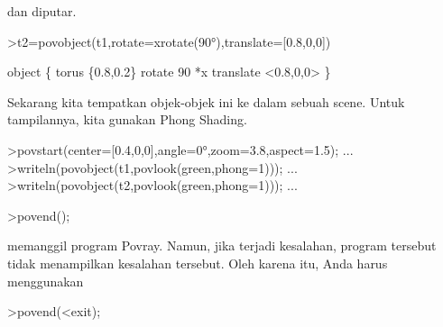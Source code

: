 \documentclass[a4paper,10pt]{article}
\begin{document}
\begin{eulernotebook}
\begin{eulercomment}
\begin{eulercomment}
\begin{eulercomment}
\begin{eulercomment}
\begin{eulercomment}
\begin{eulercomment}
\begin{eulercomment}
\begin{eulercomment}
\begin{eulercomment}
\begin{eulercomment}
\begin{eulercomment}
\begin{eulercomment}
\begin{eulercomment}
\begin{eulercomment}
\begin{eulercomment}
\begin{eulercomment}
\begin{eulercomment}
\begin{eulercomment}
\begin{eulercomment}
\begin{eulercomment}
\begin{eulercomment}
\begin{eulercomment}
\begin{eulercomment}
\begin{eulercomment}
\begin{eulercomment}
\begin{eulercomment}
\begin{eulercomment}
\begin{eulercomment}
\begin{eulercomment}
\begin{eulercomment}
\begin{eulercomment}
\begin{eulercomment}
\begin{eulercomment}
\begin{eulercomment}
\begin{eulercomment}
\begin{eulercomment}
\begin{eulercomment}
\begin{eulercomment}
\begin{eulercomment}
\begin{eulercomment}
\begin{eulercomment}
dan diputar.
\end{eulercomment}
\begin{eulerprompt}
>t2=povobject(t1,rotate=xrotate(90°),translate=[0.8,0,0])
\end{eulerprompt}
\begin{euleroutput}
  object \{ torus \{0.8,0.2\}
   rotate 90 *x 
   translate <0.8,0,0>
   \}
\end{euleroutput}
\begin{eulercomment}
Sekarang kita tempatkan objek-objek ini ke dalam sebuah scene. Untuk
tampilannya, kita gunakan Phong Shading.
\end{eulercomment}
\begin{eulerprompt}
>povstart(center=[0.4,0,0],angle=0°,zoom=3.8,aspect=1.5); ...
>writeln(povobject(t1,povlook(green,phong=1))); ...
>writeln(povobject(t2,povlook(green,phong=1))); ...
\end{eulerprompt}
\begin{eulercomment}
\textgreater{}povend();

memanggil program Povray. Namun, jika terjadi kesalahan, program
tersebut tidak menampilkan kesalahan tersebut. Oleh karena itu, Anda
harus menggunakan

\textgreater{}povend(\textless{}exit);


\end{eulercomment}
\end{eulercomment}
\end{eulercomment}
\end{eulercomment}
\end{eulercomment}
\end{eulercomment}
\end{eulercomment}
\end{eulercomment}
\end{eulercomment}
\end{eulercomment}
\end{eulercomment}
\end{eulercomment}
\end{eulercomment}
\end{eulercomment}
\end{eulercomment}
\end{eulercomment}
\end{eulercomment}
\end{eulercomment}
\end{eulercomment}
\end{eulercomment}
\end{eulercomment}
\end{eulercomment}
\end{eulercomment}
\end{eulercomment}
\end{eulercomment}
\end{eulercomment}
\end{eulercomment}
\end{eulercomment}
\end{eulercomment}
\end{eulercomment}
\end{eulercomment}
\end{eulercomment}
\end{eulercomment}
\end{eulercomment}
\end{eulercomment}
\end{eulercomment}
\end{eulercomment}
\end{eulercomment}
\end{eulercomment}
\end{eulercomment}
\end{eulercomment}
\end{eulernotebook}
\end{document}
